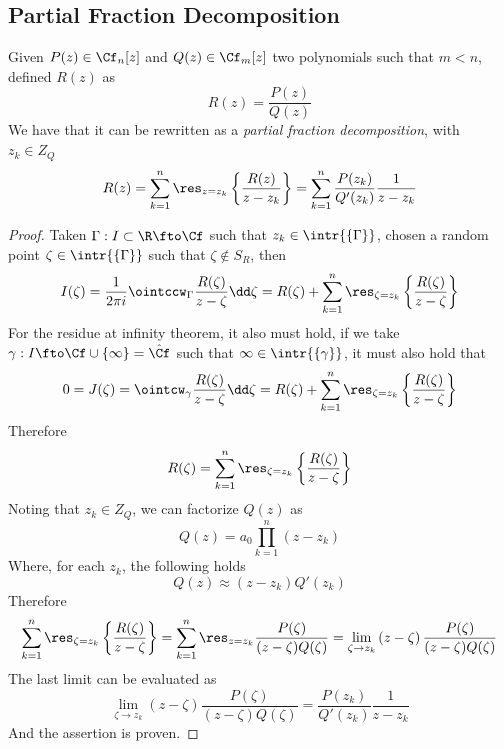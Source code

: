 \documentclass[../mmf.tex]{subfiles}
\begin{document}
\subsection{Partial Fraction Decomposition}
\begin{thm}
	Given $P(z)\in\Cf_n[z]$ and $Q(z)\in\Cf_m[z]$ two polynomials such that $m<n$, defined $R(z)$ as
	\begin{equation*}
		R(z)=\frac{P(z)}{Q(z)}
	\end{equation*}
	We have that it can be rewritten as a \textit{partial fraction decomposition}, with $z_k\in Z_Q$
	\begin{equation}
		R(z)=\sum_{k=1}^n\res_{z=z_k}\left\{\frac{R(z)}{z-z_k}\right\}=\sum_{k=1}^{n}\frac{P(z_k)}{Q'(z_k)}\frac{1}{z-z_k}
		\label{eq:partialfraction}
	\end{equation}
\end{thm}
\begin{proof}
	Taken $\Gamma:I\subset\R\fto\Cf$ such that $z_k\in\intr{ \left\{ \Gamma \right\} }$, chosen a random point $\zeta\in\intr{ \left\{ \Gamma \right\}}$ such that $\zeta\not\in S_R$, then
	\begin{equation*}
		I(\zeta)=\frac{1}{2\pi i}\ointccw_{\Gamma}\frac{R(\zeta)}{z-\zeta}\dd\zeta=R(\zeta)+\sum_{k=1}^{n}\res_{\zeta=z_k}\left\{ \frac{R(\zeta)}{z-\zeta} \right\}
	\end{equation*}
	For the residue at infinity theorem, it also must hold, if we take $\gamma:I\fto\Cf\cup\{\infty\}=\hat{\Cf}$ such that $\infty\in\intr{ \left\{ \gamma \right\} }$, it must also hold that
	\begin{equation*}
		0=J(\zeta)=\ointcw_{\gamma}\frac{R(\zeta)}{z-\zeta}\dd\zeta=R(\zeta)+\sum_{k=1}^{n}\res_{\zeta=z_k}\left\{ \frac{R(\zeta)}{z-\zeta} \right\}
	\end{equation*}
	Therefore 
	\begin{equation*}
		R(\zeta)=\sum_{k=1}^{n}\res_{\zeta=z_k}\left\{ \frac{R(\zeta)}{z-\zeta} \right\}
	\end{equation*}
	Noting that $z_k\in Z_Q$, we can factorize $Q(z)$ as
	\begin{equation*}
		Q(z)=a_0\prod_{k=1}^{n}\left( z-z_k \right)
	\end{equation*}
	Where, for each $z_k$, the following holds
	\begin{equation*}
		Q(z)\approx\left( z-z_k \right)Q'(z_k)
	\end{equation*}
	Therefore
	\begin{equation*}
		\sum_{k=1}^n\res_{\zeta=z_k}\left\{ \frac{R(\zeta)}{z-\zeta} \right\}=\sum_{k=1}^n\res_{z=z_k}\frac{P(\zeta)}{(z-\zeta)Q(\zeta)}=\lim_{\zeta\to z_k}\left( z-\zeta \right)\frac{P(\zeta)}{(z-\zeta)Q(\zeta)}
	\end{equation*}
	The last limit can be evaluated as
	\begin{equation*}
		\lim_{\zeta\to z_k}\left( z-\zeta \right)\frac{P(\zeta)}{(z-\zeta)Q(\zeta)}=\frac{P(z_k)}{Q'(z_k)}\frac{1}{z-z_k}
	\end{equation*}
	And the assertion is proven.
\end{proof}
\end{document}
